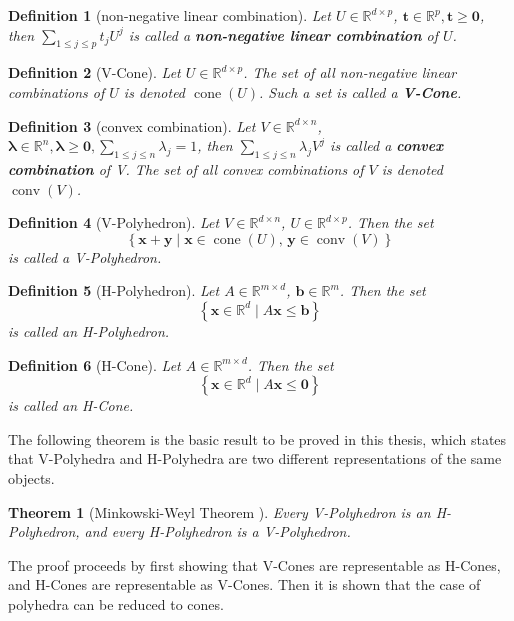 \documentclass[fleqn]{article}
\renewcommand{\vec}[1]{\mathbf{#1}}
\newcommand{\set}[1]{\left\{#1\right\}}
\DeclareMathOperator{\cone}{cone}
\DeclareMathOperator{\conv}{conv}
\newcommand{\ip}[2]{\left\langle #1, #2 \right\rangle}
\newcommand{\R}{\mathbb{R}}
\newcommand{\0}{\vec{0}}
\newcommand{\x}{\vec{x}}
\newcommand{\y}{\vec{y}}
\renewcommand{\t}{\vec{t}}
\renewcommand{\b}{\vec{b}}
\newcommand{\st}{\;|\;}
\newcommand{\St}{\;\Big|\;}
\newcommand{\Udim}{p}
\newcommand{\Vdim}{n}
\newcommand{\Adim}{m}
\newcommand{\mspaceA}{\R^{{\Adim}\times d}}
\newcommand{\bv}{\b \in \R^{\Adim}}
\newcommand{\tv}{\t \in \R^{\Udim}}
\renewcommand{\l}{\bm{\lambda}}
\newcommand{\lv}{\l \in \R^{\Vdim}}
\newcommand{\xv}{\x \in \R^d}
\newcommand{\mV}{V \in \R^{d\times \Vdim}}
\newcommand{\mU}{U \in \R^{d\times \Udim}}
\newcommand{\mA}{A \in \mspaceA}
\newcommand{\tusum}{\sum_{1\leq j \leq \Udim}t_j U^j}
\newcommand{\lvsum}{\sum_{1\leq j \leq \Vdim}\lambda_j V^j}
\newcommand{\lsum}{\sum_{1\leq j \leq \Vdim}\lambda_j}
\newcommand{\isconv}{\lambda_j \geq 0 \lsum = 1}
\newtheorem{Def}{Definition}
\newtheorem{Thm}{Theorem}
\newcommand{\MWT}{Minkowski-Weyl Theorem }
\begin{document}

\begin{Def}[non-negative linear combination]{
  Let $\mU$, $\tv, \t \geq \0$, then \( \tusum \) is called a \textbf{non-negative linear combination} of $U$.
}\end{Def}

\begin{Def}[V-Cone]{
  Let $\mU$.  The set of all non-negative linear combinations of $U$ is denoted $\cone(U)$.  Such a set is called a \textbf{V-Cone}.
}\end{Def} 

\begin{Def}[convex combination]{
  Let $\mV$, $\lv, \l \geq\0, \lsum = 1$, then \( \lvsum \) is called a \textbf{convex combination} of V.  The set of all convex combinations of $V$ is denoted $\conv(V)$.
}\end{Def}

\begin{Def}[V-Polyhedron]{
  Let $\mV$, $\mU$.  Then the set
  \[ \set{\x + \y \st \x \in \cone(U),\, \y \in \conv(V)} \]
  is called a \em{V-Polyhedron}.
}\end{Def}

\begin{Def}[H-Polyhedron]{
  Let $\mA$, $\bv$.  Then the set
  \[ \set{\xv \St A\x \leq \b} \]
  is called an \em{H-Polyhedron}.
}\end{Def}

\begin{Def}[H-Cone]{
  Let $\mA$. Then the set
  \[ \set{\xv \St A\x \leq \0} \]
  is called an \em{H-Cone}.
}\end{Def}

The following theorem is the basic result to be proved in this thesis, which states that V-Polyhedra and H-Polyhedra are two different representations of the same objects.

\begin{Thm}[\MWT]{
  Every V-Polyhedron is an H-Polyhedron, and every H-Polyhedron is a V-Polyhedron.
}\end{Thm}

The proof proceeds by first showing that V-Cones are representable as H-Cones, and H-Cones are representable as V-Cones.  Then it is shown that the case of polyhedra can be reduced to cones.
\end{document}
